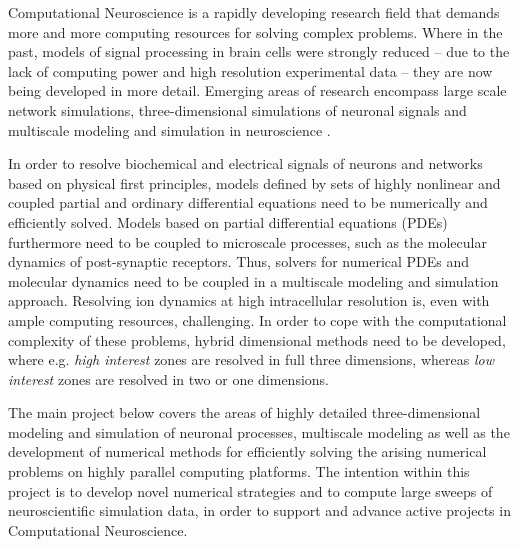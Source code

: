Computational Neuroscience is a rapidly developing research field that demands more and more computing resources for solving complex problems. Where in the past, models of signal processing in brain cells were strongly reduced -- due to the lack of computing power and high resolution experimental data -- they are now being developed in more detail. Emerging areas of research encompass large scale network simulations, three-dimensional simulations of neuronal signals \cite{Xylouris2007, Xylouris2012, Breit2016, Breit2018a, Breit2018b} and multiscale modeling and simulation in neuroscience \cite{Stepniewski2019b}.

In order to resolve biochemical and electrical signals of neurons and networks based on physical first principles, models defined by sets of highly nonlinear and coupled partial and ordinary differential equations need to be numerically and efficiently solved. Models based on partial differential equations (PDEs) furthermore need to be coupled to microscale processes, such as the molecular dynamics of post-synaptic receptors. Thus, solvers for numerical PDEs and molecular dynamics need to be coupled in a multiscale modeling and simulation approach. Resolving ion dynamics at high intracellular resolution is, even with ample computing resources, challenging. In order to cope with the computational complexity of these problems, hybrid dimensional methods need to be developed, where e.g. \emph{high interest} zones are resolved in full three dimensions, whereas \emph{low interest} zones are resolved in two or one dimensions.

The main project below covers the areas of highly detailed three-dimensional modeling and simulation of neuronal processes, multiscale modeling as well as the development of numerical methods for efficiently solving the arising numerical problems on highly parallel computing platforms. The intention within this project is to develop novel numerical strategies and to compute large sweeps of neuroscientific simulation data, in order to support and advance active projects in Computational Neuroscience.
